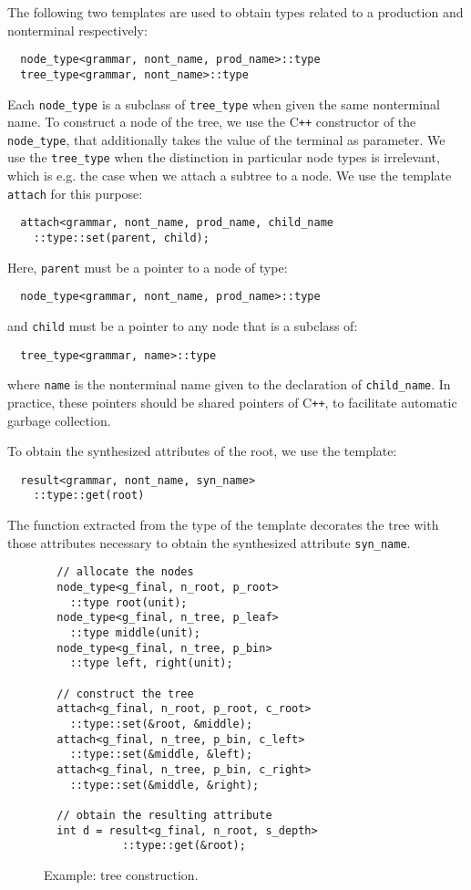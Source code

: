 \documentclass{llncs}
\newcommand*{\Cpp}{C\texttt{++}}
\begin{document}
  The following two templates are used to obtain
  types related to a production and nonterminal
  respectively:
  \begin{lstlisting}
  node_type<grammar, nont_name, prod_name>::type
  tree_type<grammar, nont_name>::type
  \end{lstlisting}
  Each \lstinline$node_type$ is a subclass of
  \lstinline$tree_type$ when given the same
  nonterminal name. To construct a node of the
  tree, we use the \Cpp{} constructor of the
  \lstinline$node_type$, that additionally
  takes the value of the terminal as parameter. 
  We use the \lstinline$tree_type$ when the
  distinction in particular node types is
  irrelevant, which is e.g. the case when
  we attach a subtree to a node. We use the
  template \lstinline$attach$ for
  this purpose:
  \begin{lstlisting}
  attach<grammar, nont_name, prod_name, child_name
    ::type::set(parent, child);
  \end{lstlisting}
  Here, \lstinline$parent$ must be a pointer to
  a node of type:
  \begin{lstlisting}
  node_type<grammar, nont_name, prod_name>::type
  \end{lstlisting}
  and \lstinline$child$ must be a pointer to
  any node that is a subclass of:
  \begin{lstlisting}
  tree_type<grammar, name>::type
  \end{lstlisting}
  where \lstinline$name$ is the nonterminal name
  given to the declaration of \lstinline$child_name$.
  In practice, these pointers should be shared pointers
  of \Cpp, to facilitate automatic garbage collection.
  
  To obtain the synthesized attributes of the root,
  we use the template: 
  \begin{lstlisting}
  result<grammar, nont_name, syn_name>
    ::type::get(root)
  \end{lstlisting}
  The function extracted from the type of the template
  decorates the tree with those attributes necessary to obtain the
  synthesized attribute \lstinline$syn_name$.
  
  \begin{figure}[ht]
  \begin{lstlisting}
  // allocate the nodes
  node_type<g_final, n_root, p_root>
    ::type root(unit);
  node_type<g_final, n_tree, p_leaf>
    ::type middle(unit);
  node_type<g_final, n_tree, p_bin>
    ::type left, right(unit);

  // construct the tree
  attach<g_final, n_root, p_root, c_root>
    ::type::set(&root, &middle);
  attach<g_final, n_tree, p_bin, c_left>
    ::type::set(&middle, &left);
  attach<g_final, n_tree, p_bin, c_right>
    ::type::set(&middle, &right);

  // obtain the resulting attribute
  int d = result<g_final, n_root, s_depth>
            ::type::get(&root);
  \end{lstlisting}
  \caption{Example: tree construction.}
  \label{fig:example:construct}
  \end{figure}
\end{document}
